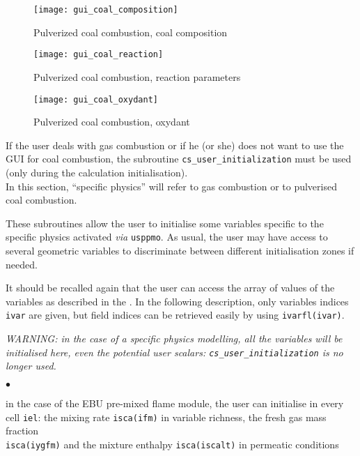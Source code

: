 {{{\begin{figure}[!ht]
\begin{center}
\texttt{[image: gui\_coal\_composition]}
\caption{Pulverized coal combustion, coal composition}
\label{fig:Ini-coal3}
\end{center}
\end{figure}

\begin{figure}[!ht]
\begin{center}
\texttt{[image: gui\_coal\_reaction]}
\caption{Pulverized coal combustion, reaction parameters}
\label{fig:Ini-coal4}
\end{center}
\end{figure}

\begin{figure}[!ht]
\begin{center}
\texttt{[image: gui\_coal\_oxydant]}
\caption{Pulverized coal combustion, oxydant}
\label{fig:Ini-coal5}
\end{center}
\end{figure}

If the user deals with gas combustion or if he (or she) does not want to use the
GUI for coal combustion, the subroutine \texttt{cs\_user\_initialization} must be used (only during the calculation initialisation).\\
In this section, ``specific physics'' will refer to gas combustion or
to pulverised coal combustion.

These subroutines allow the user to initialise some variables specific
to the specific physics activated {\em via} \texttt{usppmo}. As usual,
the user may have access to several geometric variables to discriminate
between different initialisation zones if needed.

It should be recalled again that the user can access the array of values of the
variables as described in the . In the following description,
only variables indices \texttt{ivar} are given, but field indices can be
retrieved easily by using \texttt{ivarfl(ivar)}.

{\em WARNING: in the case of a specific physics modelling, all the
variables will be initialised here, even the potential user scalars: {\em
\texttt{cs\_user\_initialization}} is no longer used.}


\begin{list}{$\bullet$}{}
       \item in the case of the EBU pre-mixed flame module, the user can
             initialise in every cell \texttt{iel}: the mixing rate
             \texttt{isca(ifm)} in variable richness, the
             fresh gas mass fraction \\
             \texttt{isca(iygfm)}
             and the mixture enthalpy \texttt{isca(iscalt)} in
             permeatic conditions


\end{list}}}}
